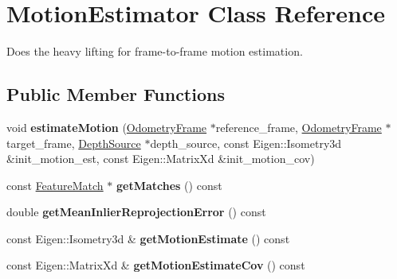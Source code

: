 \hypertarget{classfovis_1_1MotionEstimator}{
\section{MotionEstimator Class Reference}
\label{classfovis_1_1MotionEstimator}
}


Does the heavy lifting for frame-\/to-\/frame motion estimation.  


\subsection*{Public Member Functions}
\begin{DoxyCompactItemize}
\item 
\hypertarget{classfovis_1_1MotionEstimator_a0a9d692b99e362439b1c363e854e1f0d}{
void {\bfseries estimateMotion} (\hyperlink{classfovis_1_1OdometryFrame}{OdometryFrame} $\ast$reference\_\-frame, \hyperlink{classfovis_1_1OdometryFrame}{OdometryFrame} $\ast$target\_\-frame, \hyperlink{classfovis_1_1DepthSource}{DepthSource} $\ast$depth\_\-source, const Eigen::Isometry3d \&init\_\-motion\_\-est, const Eigen::MatrixXd \&init\_\-motion\_\-cov)}
\label{classfovis_1_1MotionEstimator_a0a9d692b99e362439b1c363e854e1f0d}

\item 
\hypertarget{classfovis_1_1MotionEstimator_a8b52710e622490cc57812eab5dd517c4}{
const \hyperlink{classfovis_1_1FeatureMatch}{FeatureMatch} $\ast$ {\bfseries getMatches} () const }
\label{classfovis_1_1MotionEstimator_a8b52710e622490cc57812eab5dd517c4}

\item 
\hypertarget{classfovis_1_1MotionEstimator_af660d3133abdf4592d5b2f64c7f159c9}{
double {\bfseries getMeanInlierReprojectionError} () const }
\label{classfovis_1_1MotionEstimator_af660d3133abdf4592d5b2f64c7f159c9}

\item 
\hypertarget{classfovis_1_1MotionEstimator_a7c8a153a489f90c60123666495900a72}{
const Eigen::Isometry3d \& {\bfseries getMotionEstimate} () const }
\label{classfovis_1_1MotionEstimator_a7c8a153a489f90c60123666495900a72}

\item 
\hypertarget{classfovis_1_1MotionEstimator_a13c92fba48648f413eebccd6fde24e18}{
const Eigen::MatrixXd \& {\bfseries getMotionEstimateCov} () const }
\label{classfovis_1_1MotionEstimator_a13c92fba48648f413eebccd6fde24e18}


\end{DoxyCompactItemize}
